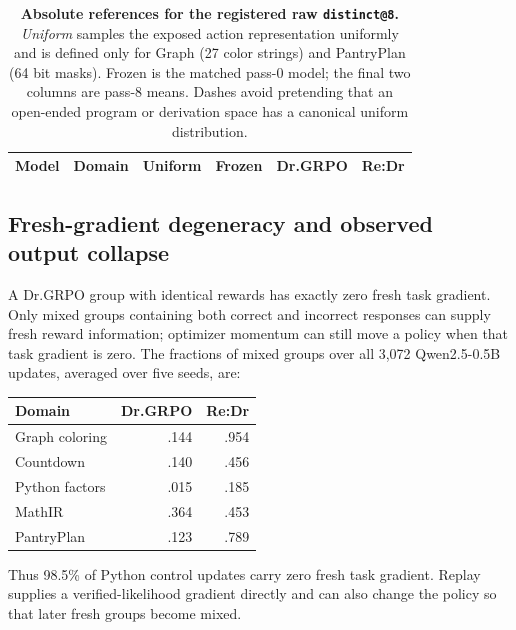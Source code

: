 \documentclass{article}
\makeatletter
\newcommand{\1}{\mathbf 1}
\newcommand{\distk}{\texttt{distinct@8}}
\theoremstyle{remark}
\theoremstyle{definition}
\theoremstyle{plain}
\makeatother
\begin{document}
\begin{table}[t]
  \centering
  \caption{\textbf{Absolute references for the registered raw \distk{}.}
  \emph{Uniform} samples the exposed action representation uniformly and is
  defined only for Graph (27 color strings) and PantryPlan (64 bit masks).
  Frozen is the matched pass-0 model; the final two columns are pass-8 means.
  Dashes avoid pretending that an open-ended program or derivation space has a
  canonical uniform distribution.}
  \label{tab:absolute-support-references}
  \scriptsize
  \setlength{\tabcolsep}{4.2pt}
  \begin{tabular}{@{}llrrrr@{}}
    \toprule
    \textbf{Model} & \textbf{Domain} & \textbf{Uniform} & \textbf{Frozen}
      & \textbf{Dr.GRPO} & \textbf{Re:Dr} \\
    \midrule
    
  \end{tabular}
\end{table}


\subsection{Fresh-gradient degeneracy and observed output collapse}
\label{app:degenerate-groups}

A Dr.GRPO group with identical rewards has exactly zero fresh task gradient.
Only mixed groups containing both correct and incorrect responses can
supply fresh reward information; optimizer momentum can still move a
policy when that task gradient is zero. The fractions of mixed groups
over all 3,072 Qwen2.5-0.5B updates, averaged over five seeds, are:

\begin{center}
\small
\begin{tabular}{@{}lrr@{}}
\toprule
\textbf{Domain} & \textbf{Dr.GRPO} & \textbf{Re:Dr} \\
\midrule
Graph coloring & .144 & .954 \\
Countdown & .140 & .456 \\
Python factors & .015 & .185 \\
MathIR & .364 & .453 \\
PantryPlan & .123 & .789 \\
\bottomrule
\end{tabular}
\end{center}

Thus 98.5\% of Python control updates carry zero fresh task gradient.
Replay supplies a verified-likelihood gradient directly and can also
change the policy so that later fresh groups become mixed.
\end{document}
